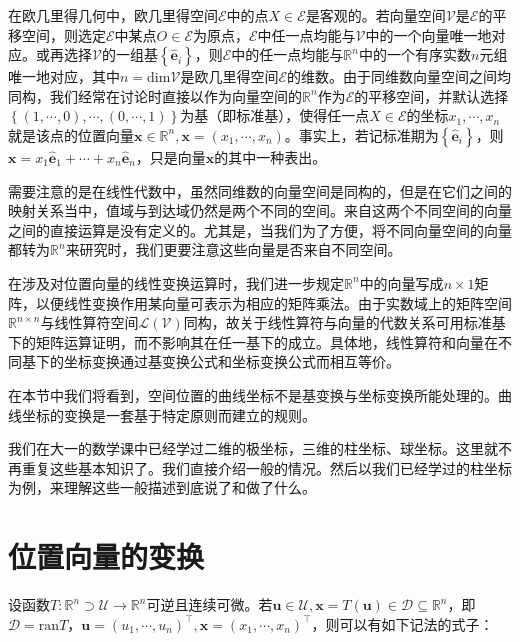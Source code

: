\documentclass[main.tex]{subfiles}
\begin{document}
在欧几里得几何中，欧几里得空间$\mathcal{E}$中的点$X\in\mathcal{E}$是客观的。若向量空间$\mathcal{V}$是$\mathcal{E}$的平移空间，则选定$\mathcal{E}$中某点$O\in\mathcal{E}$为原点，$\mathcal{E}$中任一点均能与$\mathcal{V}$中的一个向量唯一地对应。或再选择$\mathcal{V}$的一组基$\left\{\mathbf{\hat{e}}_i\right\}$，则$\mathcal{E}$中的任一点均能与$\mathbb{R}^n$中的一个有序实数$n$元组唯一地对应，其中$n=\mathrm{dim}\mathcal{V}$是欧几里得空间$\mathcal{E}$的维数。由于同维数向量空间之间均同构，我们经常在讨论时直接以作为向量空间的$\mathbb{R}^n$作为$\mathcal{E}$的平移空间，并默认选择$\left\{\left(1,\cdots,0\right),\cdots,\left(0,\cdots,1\right)\right\}$为基（即标准基），使得任一点$X\in\mathcal{E}$的坐标$x_1,\cdots,x_n$就是该点的位置向量$\mathbf{x}\in\mathbb{R}^n,\mathbf{x}=\left(x_1,\cdots,x_n\right)$。事实上，若记标准期为$\left\{\mathbf{\hat{e}}_i\right\}$，则$\mathbf{x}=x_1\mathbf{\hat{e}}_1+\cdots+x_n\mathbf{\hat{e}}_n$，只是向量$\mathbf{x}$的其中一种表出。

需要注意的是在线性代数中，虽然同维数的向量空间是同构的，但是在它们之间的映射关系当中，值域与到达域仍然是两个不同的空间。来自这两个不同空间的向量之间的直接运算是没有定义的。尤其是，当我们为了方便，将不同向量空间的向量都转为$\mathbb{R}^n$来研究时，我们更要注意这些向量是否来自不同空间。

在涉及对位置向量的线性变换运算时，我们进一步规定$\mathbb{R}^n$中的向量写成$n\times 1$矩阵，以便线性变换作用某向量可表示为相应的矩阵乘法。由于实数域上的矩阵空间$\mathbb{R}^{n\times n}$与线性算符空间$\mathcal{L}\left(\mathcal{V}\right)$同构，故关于线性算符与向量的代数关系可用标准基下的矩阵运算证明，而不影响其在任一基下的成立。具体地，线性算符和向量在不同基下的坐标变换通过基变换公式和坐标变换公式而相互等价。

在本节中我们将看到，空间位置的曲线坐标不是基变换与坐标变换所能处理的。曲线坐标的变换是一套基于特定原则而建立的规则。

我们在大一的数学课中已经学过二维的极坐标，三维的柱坐标、球坐标。这里就不再重复这些基本知识了。我们直接介绍一般的情况。然后以我们已经学过的柱坐标为例，来理解这些一般描述到底说了和做了什么。

\section{位置向量的变换}
设函数$T:\mathbb{R}^n\supset\mathcal{U}\rightarrow\mathbb{R}^n$可逆且连续可微。若$\mathbf{u}\in\mathcal{U},\mathbf{x}=T\left(\mathbf{u}\right)\in\mathcal{D}\subseteq\mathbb{R}^n$，即$\mathcal{D}=\mathrm{ran}T$，$\mathbf{u}=\left(u_1,\cdots,u_n\right)^\intercal,\mathbf{x}=\left(x_1,\cdots,x_n\right)^\intercal$，则可以有如下记法的式子：
\end{document}
